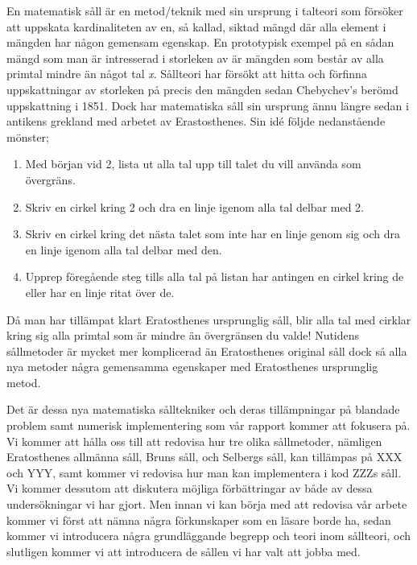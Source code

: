 En matematisk såll är en metod/teknik med sin ursprung i talteori som försöker att uppskata kardinaliteten av en, så kallad, siktad mängd där alla element i mängden har någon gemensam egenskap. En prototypisk exempel på en sådan mängd som man är intresserad i storleken av är mängden som består av alla primtal mindre än något tal \textit{x}. Sållteori har försökt att hitta och förfinna uppskattningar av storleken på precis den mängden sedan Chebychev's berömd uppskattning i 1851. Dock har matematiska såll sin ursprung ännu längre sedan i antikens grekland med arbetet av Erastosthenes. Sin idé följde nedanstående mönster;
\begin{enumerate}
    \item Med början vid 2, lista ut alla tal upp till talet du vill använda som övergräns.
    \item Skriv en cirkel kring 2 och dra en linje igenom alla tal delbar med 2.
    \item Skriv en cirkel kring det nästa talet som inte har en linje genom sig och dra en linje igenom alla tal delbar med den.
    \item Upprep föregående steg tills alla tal på listan har antingen en cirkel kring de eller har en linje ritat över de.
\end{enumerate}
Då man har tillämpat klart Eratosthenes ursprunglig såll, blir alla tal med cirklar kring sig alla primtal som är mindre än övergränsen du valde! Nutidens sållmetoder är mycket mer komplicerad än Eratosthenes original såll dock så alla nya metoder några gemensamma egenskaper med Eratosthenes ursprunglig metod.

Det är dessa nya matematiska sålltekniker och deras tillämpningar på blandade problem samt numerisk implementering som vår rapport kommer att fokusera på. Vi kommer att hålla oss till att redovisa hur tre olika sållmetoder, nämligen Eratosthenes allmänna såll, Bruns såll, och Selbergs såll, kan tillämpas på XXX och YYY, samt kommer vi redovisa hur man kan implementera i kod ZZZs såll. Vi kommer dessutom att diskutera möjliga förbättringar av både av dessa undersökningar vi har gjort. Men innan vi kan börja med att redovisa vår arbete kommer vi först att nämna några förkunskaper som en läsare borde ha, sedan kommer vi introducera några grundläggande begrepp och teori inom sållteori, och slutligen kommer vi att introducera de sållen vi har valt att jobba med.